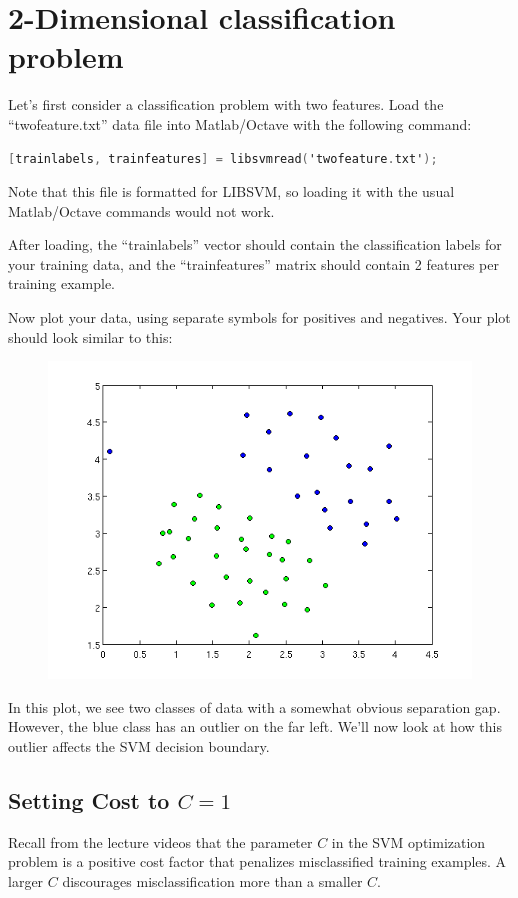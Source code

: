 \documentclass[10pt,a4paper]{article}
\begin{document}
\section{2-Dimensional classification problem}
%
  Let's first consider a classification problem with two features. Load the ``twofeature.txt'' data file into Matlab/Octave with the following command:
  \begin{lstlisting}[language=C, basicstyle=\footnotesize, showspaces=false]
    [trainlabels, trainfeatures] = libsvmread('twofeature.txt');
  \end{lstlisting}
  Note that this file is formatted for LIBSVM, so loading it with the usual Matlab/Octave commands would not work.

  After loading, the ``trainlabels'' vector should contain the classification labels for your training data, and the ``trainfeatures'' matrix should contain 2 features per training example.

  Now plot your data, using separate symbols for positives and negatives. Your plot should look similar to this:
  \begin{figure}[htb!]
    \centering
      \includegraphics[width=.7\columnwidth]{twofeaturedata}
  \end{figure}
  In this plot, we see two classes of data with a somewhat obvious separation gap. However, the blue class has an outlier on the far left. We'll now look at how this outlier affects the SVM decision boundary.




  \subsection{Setting Cost to $C = 1$}
  Recall from the lecture videos that the parameter $C$ in the SVM optimization problem is a positive cost factor that penalizes misclassified training examples. A larger $C$ discourages misclassification more than a smaller $C$.
\end{document}
